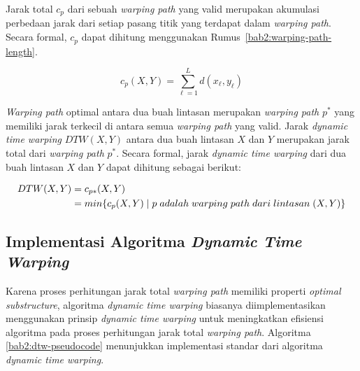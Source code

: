 Jarak total $c_p$ dari sebuah \textit{warping path} yang valid merupakan akumulasi perbedaan jarak dari setiap pasang titik yang terdapat dalam \textit{warping path}. Secara formal, $c_p$ dapat dihitung menggunakan Rumus~\ref{bab2:warping-path-length}.

\begin{equation}
    c_p(X, Y) = \sum_{\ell = 1}^{L} d(x_\ell, y_\ell)
    \label{bab2:warping-path-length}
\end{equation}

\textit{Warping path} optimal antara dua buah lintasan merupakan \textit{warping path} $p^*$ yang memiliki jarak terkecil di antara semua \textit{warping path} yang valid. Jarak \textit{dynamic time warping} $DTW(X, Y)$ antara dua buah lintasan $X$ dan $Y$ merupakan jarak total dari \textit{warping path} $p^*$. Secara formal, jarak \textit{dynamic time warping} dari dua buah lintasan $X$ dan $Y$ dapat dihitung sebagai berikut:

\begin{align*}
    DTW(X, Y) & = c\textsubscript{$p*$}(X, Y) \\
    & = min\{c_p(X, Y)\;|\;p\;adalah\;warping\;path\;dari\;lintasan\;(X, Y)\}
\end{align*}

\subsection{Implementasi Algoritma \textit{Dynamic Time Warping}}

Karena proses perhitungan jarak total \textit{warping path} memiliki properti \textit{optimal substructure}, algoritma \textit{dynamic time warping} biasanya diimplementasikan menggunakan prinsip \textit{dynamic time warping} untuk meningkatkan efisiensi algoritma pada proses perhitungan jarak total \textit{warping path}. Algoritma \ref{bab2:dtw-pseudocode} menunjukkan implementasi standar dari algoritma \textit{dynamic time warping}.

